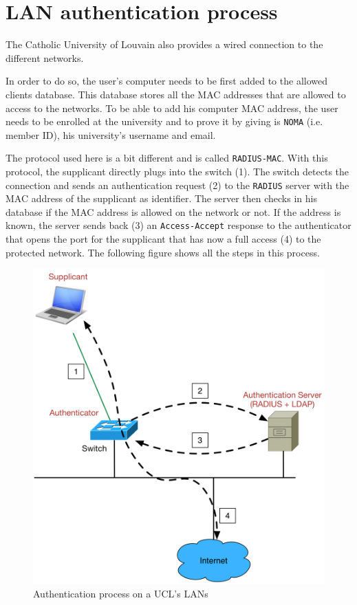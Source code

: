\section{LAN authentication process}
The Catholic University of Louvain also provides a wired connection to the different networks.

In order to do so, the user's computer needs to be first added to the allowed clients database. This database stores all the MAC addresses that are allowed to access to the networks. 
To be able to add his computer MAC address, the user needs to be enrolled at the university and to prove it by giving is \texttt{NOMA} (i.e. member ID), his university's username and email.

The protocol used here is a bit different and is called \texttt{RADIUS-MAC}. With this protocol, the supplicant directly plugs into the switch (1). The switch detects the connection and sends an authentication request (2) to the \texttt{RADIUS} server with the MAC address of the supplicant as identifier. The server then checks in his database if the MAC address is allowed on the network or not. If the address is known, the server sends back (3) an \texttt{Access-Accept} response to the authenticator that opens the port for the supplicant that has now a full access (4) to the protected network. The following figure shows all the steps in this process.

\begin{figure}[H]
	\includegraphics[width=.7\linewidth]{Pictures/Chapter2/wired.png}
	\caption{Authentication process on a UCL's LANs}
\end{figure}

